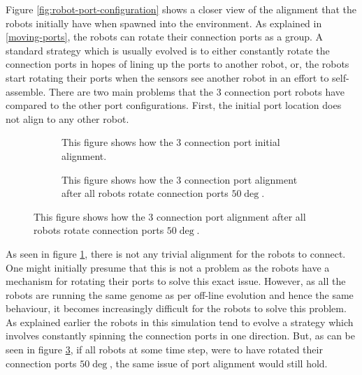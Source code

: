Figure \ref{fig:robot-port-configuration} shows a closer view of the alignment that the robots initially have when spawned into the environment.
As explained in \ref{moving-ports}, the robots can rotate their connection ports as a group.
A standard strategy which is usually evolved is to either constantly rotate the connection ports in hopes of lining up the ports to another robot, or, the robots start rotating their ports when the sensors see another robot in an effort to self-assemble.
There are two main problems that the 3 connection port robots have compared to the other port configurations.
First, the initial port location does not align to any other robot.


\begin{figure}[H]
	\begin{subfigure}[t]{0.49\textwidth}
		\centering
		\caption{This figure shows how the 3 connection port initial alignment.}
		\label{3-port-guided-allignment}
	\end{subfigure}
	\begin{subfigure}[t]{0.49\textwidth}
		\centering
		\caption{This figure shows how the 3 connection port alignment after all robots rotate connection ports $50\deg$.}
		\label{3-port-guided-allignment-offset}
	\end{subfigure}
\end{figure}



As seen in figure \ref{3-port-guided-allignment}, there is not any trivial alignment for the robots to connect.
One might initially presume that this is not a problem as the robots have a mechanism for rotating their ports to solve this exact issue.
However, as all the robots are running the same genome as per off-line evolution and hence the same behaviour, it becomes increasingly difficult for the robots to solve this problem.
As explained earlier the robots in this simulation tend to evolve a strategy which involves constantly spinning the connection ports in one direction.
But, as can be seen in figure \ref{3-port-guided-allignment-offset}, if all robots at some time step, were to have rotated their connection ports $50\deg$, the same issue of port alignment would still hold.




























